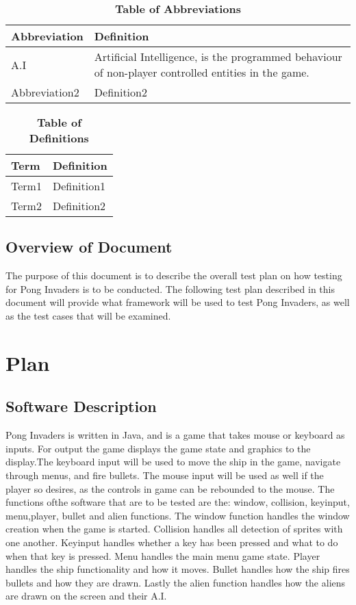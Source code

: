\documentclass[12pt, titlepage]{article}
\begin{document}
\begin{table}[hbp]
\caption{\textbf{Table of Abbreviations}} \label{Table}

\begin{tabularx}{\textwidth}{p{3cm}X}
\toprule
\textbf{Abbreviation} & \textbf{Definition} \\
\midrule
A.I & Artificial Intelligence, is the programmed behaviour of non-player
controlled entities in the game.\\
Abbreviation2 & Definition2\\
\bottomrule
\end{tabularx}

\end{table}

\begin{table}[!htbp]
\caption{\textbf{Table of Definitions}} \label{Table}

\begin{tabularx}{\textwidth}{p{3cm}X}
\toprule
\textbf{Term} & \textbf{Definition}\\
\midrule
Term1 & Definition1\\
Term2 & Definition2\\
\bottomrule
\end{tabularx}

\end{table}	

\subsection{Overview of Document}
The purpose of this document is to describe the overall test plan on
how testing for Pong Invaders is to be conducted. The following test plan
described in this document will provide what framework will be used to test
Pong Invaders, as well as the test cases that will be examined.

\section{Plan}
	
\subsection{Software Description}
Pong Invaders is written in Java, and is a game that takes mouse or keyboard as
inputs. For output the game displays the game state and graphics to the
display.The keyboard input will be used to move the ship in the game, navigate
through
menus, and fire bullets. The mouse input will be used as well if the player so
desires, as the controls in game can be rebounded to the mouse. The functions
ofthe software that are to be tested are the: window, collision, keyinput,
menu,player, bullet and alien functions. The window function handles the window
creation when the game is started. Collision handles all detection of sprites
with one another. Keyinput handles whether a key has been pressed and what to
do when that key is pressed. Menu handles the main menu game state. Player
handles the ship functionality and how it moves. Bullet handles how the ship
fires
bullets and how they are drawn. Lastly the alien function handles how the
aliens are drawn on the screen and their A.I.
\end{document}
